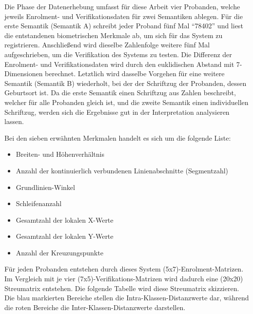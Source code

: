 \documentclass{article}
\begin{document}
Die Phase der Datenerhebung umfasst für diese Arbeit vier Probanden, welche jeweils Enrolment- und Verifikationsdaten
für zwei Semantiken ablegen. Für die erste Semantik (Semantik A) schreibt jeder Proband fünf Mal ``78402''
und liest die entstandenen biometrischen Merkmale ab, um sich für das System zu registrieren. Anschließend
wird dieselbe Zahlenfolge weitere fünf Mal aufgeschrieben, um die Verifikation des Systems zu testen. Die
Differenz der Enrolment- und Verifikationsdaten wird durch den euklidischen Abstand mit 7-Dimensionen berechnet.
Letztlich wird dasselbe Vorgehen für eine weitere Semantik (Semantik B) wiederholt, bei der der Schriftzug der
Probanden, dessen Geburtsort ist. Da die erste Semantik einen Schriftzug aus Zahlen beschreibt, welcher für alle
Probanden gleich ist, und die zweite Semantik einen individuellen Schriftzug, werden sich die Ergebnisse gut
in der Interpretation analysieren lassen. 

Bei den sieben erwähnten Merkmalen handelt es sich um die folgende Liste:

\begin{itemize}
	\item Breiten- und Höhenverhältnis
	\item Anzahl der kontinuierlich verbundenen Linienabschnitte (Segmentzahl)
	\item Grundlinien-Winkel
	\item Schleifenanzahl
	\item Gesamtzahl der lokalen X-Werte
	\item Gesamtzahl der lokalen Y-Werte
	\item Anzahl der Kreuzungspunkte
\end{itemize}

Für jeden Probanden entstehen durch dieses System (5x7)-Enrolment-Matrizen. Im Vergleich mit je vier
(7x5)-Verifikations-Matrizen wird dadurch eine (20x20) Streumatrix entstehen. Die folgende Tabelle wird
diese Streumatrix skizzieren. Die blau markierten Bereiche stellen die Intra-Klassen-Distanzwerte dar,
während die roten Bereiche die Inter-Klassen-Distanzwerte darstellen.

\vspace{1em}
\end{document}
